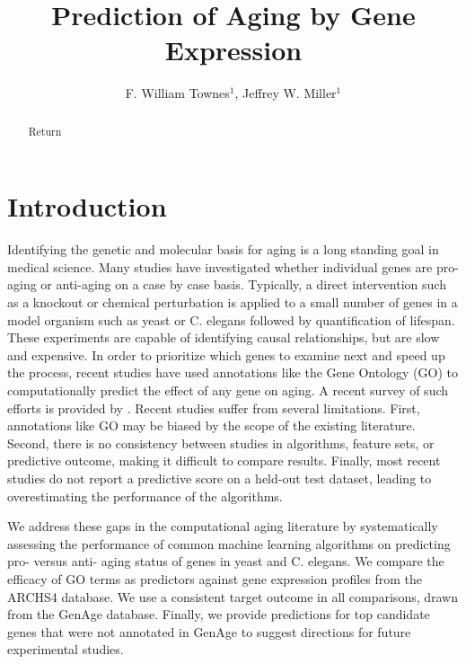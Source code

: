 \documentclass{article}
\begin{document}
\title{Prediction of Aging by Gene Expression}

\author{F. William Townes$^{1}$, Jeffrey W. Miller$^{1}$}%
\affil{\footnotesize $^{1}$Department of Biostatistics, Harvard T.H. Chan School of Public Health, Boston, MA \\%
\normalsize {ftownes@g.harvard.edu, jwmiller@hsph.harvard.edu}
}
\maketitle

\newpage
\begin{abstract}
Return
\end{abstract}

\section{Introduction}
Identifying the genetic and molecular basis for aging is a long standing goal in medical science. Many studies have investigated whether individual genes are pro-aging or anti-aging on a case by case basis. Typically, a direct intervention such as a knockout or chemical perturbation is applied to a small number of genes in a model organism such as yeast or C. elegans followed by quantification of lifespan. These experiments are capable of identifying causal relationships, but are slow and expensive. In order to prioritize which genes to examine next and speed up the process, recent studies have used annotations like the Gene Ontology (GO) to computationally predict the effect of any gene on aging. A recent survey of such efforts is provided by \cite{fabris_review_2017}. Recent studies suffer from several limitations. First, annotations like GO may be biased by the scope of the existing literature. Second, there is no consistency between studies in algorithms, feature sets, or predictive outcome, making it difficult to compare results. Finally, most recent studies do not report a predictive score on a held-out test dataset, leading to overestimating the performance of the algorithms.

We address these gaps in the computational aging literature by systematically assessing the performance of common machine learning algorithms on predicting pro- versus anti- aging status of genes in yeast and C. elegans. We compare the efficacy of GO terms as predictors against gene expression profiles from the ARCHS4 database. We use a consistent target outcome in all comparisons, drawn from the GenAge database. Finally, we provide predictions for top candidate genes that were not annotated in GenAge to suggest directions for future experimental studies.
\end{document}
